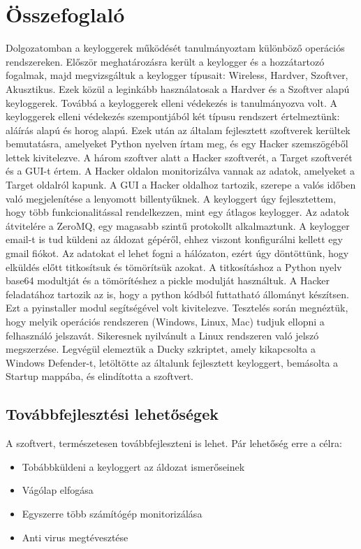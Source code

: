 \documentclass[12pt,a4paper,oneside]{report}
\begin{document}
\chapter{Összefoglaló}\label{sec:conc}
Dolgozatomban a keyloggerek működését tanulmányoztam különböző operációs rendszereken. Először meghatározásra került a keylogger és a hozzátartozó fogalmak, majd megvizsgáltuk a keylogger típusait: Wireless, Hardver, Szoftver, Akusztikus. Ezek közül a leginkább használatosak a Hardver és a Szoftver alapú keyloggerek. Továbbá a keyloggerek elleni védekezés is tanulmányozva volt. A keyloggerek elleni védekezés szempontjából két típusu rendszert értelmeztünk: aláírás alapú és horog alapú. Ezek után az általam fejlesztett szoftverek kerültek bemutatásra, amelyeket Python nyelven írtam meg, és egy Hacker szemszögéből lettek kivitelezve. A három szoftver alatt a Hacker szoftverét, a Target szoftverét és a GUI-t értem. A Hacker oldalon monitorizálva vannak az adatok, amelyeket a Target oldalról kapunk. A GUI a Hacker oldalhoz tartozik, szerepe a valós időben való megjelenítése a lenyomott billentyűknek. A keyloggert úgy fejlesztettem, hogy több funkcionalitással rendelkezzen, mint egy átlagos keylogger. Az adatok átvitelére a ZeroMQ, egy magasabb szintű protokollt alkalmaztunk. A keylogger email-t is tud küldeni az áldozat gépéről, ehhez viszont konfigurálni kellett egy gmail fiókot. Az adatokat el lehet fogni a hálózaton, ezért úgy döntöttünk, hogy elküldés előtt titkosítsuk és tömörítsük azokat. A titkosításhoz a Python nyelv base64 modultját és a tömörítéshez a pickle modulját használtuk. A Hacker feladatához tartozik az is, hogy a python kódból futtatható állományt készítsen. Ezt a pyinstaller modul segítségével volt kivitelezve. Tesztelés során megnéztük, hogy melyik operációs rendszeren (Windows, Linux, Mac) tudjuk ellopni a felhasználó jelszavát. Sikeresnek nyilvánult a Linux rendszeren való jelszó megszerzése. Legvégül elemeztük a Ducky szkriptet, amely kikapcsolta a Windows Defender-t, letöltötte az általunk fejlesztett keyloggert, bemásolta a Startup mappába, és elindította a szoftvert.

\section{Továbbfejlesztési lehetőségek}
A szoftvert, természetesen továbbfejleszteni is lehet. Pár lehetőség erre a célra:
\begin{itemize}
\item Tobábbküldeni a keyloggert az áldozat ismerőseinek
\item Vágólap elfogása
\item Egyszerre több számítógép monitorizálása
\item Anti virus megtévesztése
\end{itemize}

\renewcommand{\listfigurename}{Ábrák jegyzéke}
\listoffigures
\thispagestyle{empty}

\renewcommand{\listtablename}{Táblázatok jegyzéke}
\listoftables
\thispagestyle{empty}

\printbibliography
\end{document}
